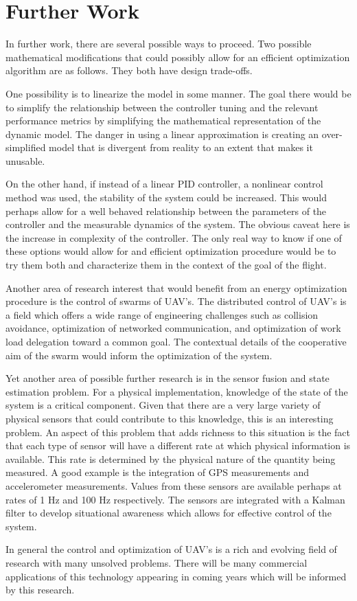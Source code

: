 \section{Further Work}

In further work, there are several possible ways to proceed. Two possible mathematical modifications that could possibly allow for an efficient optimization algorithm are as follows. They both have design trade-offs. 

One possibility is to linearize the model in some manner. The goal there would be to simplify the relationship between the controller tuning and the relevant performance metrics by simplifying the mathematical representation of the dynamic model. The danger in using a linear approximation is creating an over-simplified model that is divergent from reality to an extent that makes it unusable. 

On the other hand, if instead of a linear PID controller, a nonlinear control method was used, the stability of the system could be increased. This would perhaps allow for a well behaved relationship between the parameters of the controller and the measurable dynamics of the system. The obvious caveat  here is the increase in complexity of the controller. The only real way to know if one of these options would allow for and efficient optimization procedure would be to try them both and characterize them in the context of the goal of the flight.

Another area of research interest that would benefit from an energy optimization procedure is the control of swarms of UAV's. The distributed control of UAV's is a field which offers a wide range of engineering challenges such as collision avoidance, optimization of networked communication, and optimization of work load delegation toward a common goal. The contextual details of the cooperative aim of the swarm would inform the optimization of the system.

        
Yet another area of possible further research is in the sensor fusion and state estimation problem. For a physical implementation, knowledge of the state of the system is a critical component. Given that there are a very large variety of physical sensors that could contribute to this knowledge, this is an interesting problem. An aspect of this problem that adds richness to this situation is the fact that each type of sensor will have a different rate at which physical information is available. This rate is determined by the physical nature of the quantity being measured. A good example is the integration of GPS measurements and accelerometer measurements. Values from these sensors are available perhaps at rates of 1 Hz and 100 Hz respectively. The sensors are integrated with a Kalman filter to develop situational awareness which allows for effective control of the system.

In general the control and optimization of UAV's is a rich and evolving field of research with many unsolved problems. There will be many commercial applications of this technology appearing in coming years which will be informed by this research.






   



         
